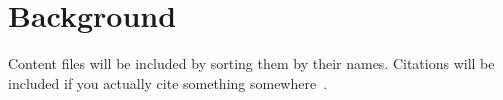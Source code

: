 \chapter{Background}\label{sec:background}

Content files will be included by sorting them by their names. Citations will be included if you actually cite something somewhere~\cite{chrestomathies}.

